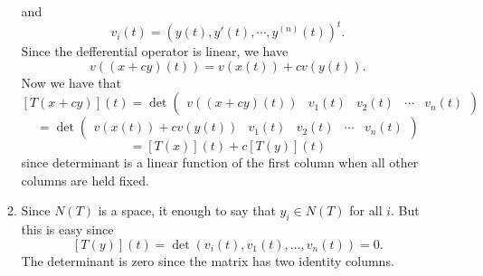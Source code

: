 \begin{enumerate}
\begin{enumerate}
 and 
\[v_i(t)=(y(t),y'(t),\cdots ,y^{(n)}(t))^t.\]
Since the defferential operator is linear, we have 
\[v((x+cy)(t))=v(x(t))+cv(y(t)).\]
Now we have that 
\[[T(x+cy)](t)=\det\begin{pmatrix}v((x+cy)(t))&v_1(t)&v_2(t)&\cdots &v_n(t)\end{pmatrix}\]
\[=\det\begin{pmatrix}v(x(t))+cv(y(t))&v_1(t)&v_2(t)&\cdots &v_n(t)\end{pmatrix}\]
\[=[T(x)](t)+c[T(y)](t)\]
since determinant is a linear function of the first column when all other columns are held fixed.
\item Since $N(T)$ is a space, it enough to say that $y_i\in N(T)$ for all $i$. But this is easy since 
\[[T(y)](t)=\det(v_i(t),v_1(t),\ldots ,v_n(t))=0.\]
The determinant is zero since the matrix has two identity columns.
\end{enumerate}
\end{enumerate}